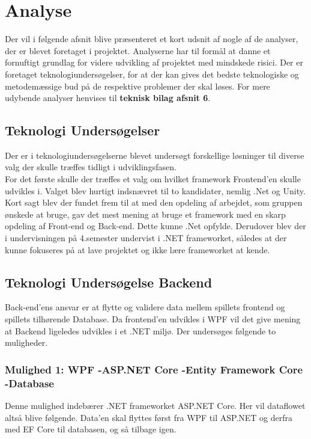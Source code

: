 \section{Analyse}
Der vil i følgende afsnit blive præsenteret et kort udsnit af nogle af de analyser, der er blevet foretaget i projektet. Analyserne har til formål at danne et fornuftigt grundlag for videre udvikling af
projektet med mindskede risici. Der er foretaget teknologiundersøgelser, for at der kan gives det bedste teknologiske og metodemæssige bud på de respektive problemer der skal løses. For mere udybende analyser henvises til \textbf{teknisk bilag afsnit 6}.

\subsection{Teknologi Undersøgelser}
Der er i teknologiundersøgelserne blevet undersøgt forskellige løsninger til diverse valg der skulle træffes tidligt i udviklingsfasen.\\
For det første skulle der træffes et valg om hvilket framework Frontend'en skulle udvikles i. Valget blev hurtigt indsnævret til to kandidater, nemlig .Net og Unity. Kort sagt blev der fundet frem til at med den opdeling af arbejdet, som gruppen ønskede at bruge, gav det mest mening at bruge et framework med en skarp opdeling af Front-end og Back-end. Dette kunne .Net opfylde. Derudover blev der i undervisningen på 4.semester undervist i .NET frameworket, således at der kunne fokuseres på at lave projektet og ikke lære frameworket at kende. 


\subsection{Teknologi Undersøgelse Backend}
Back-end’ens ansvar er at flytte og validere data mellem spillets frontend og spillets tilhørende Database. Da frontend'en udvikles i WPF vil det give mening at Backend ligeledes udvikles i et .NET miljø. Der undersøges følgende to muligheder.\\

\subsubsection{Mulighed 1: WPF -\g ASP.NET Core -\g Entity Framework Core -\g Database}
Denne mulighed indebærer .NET frameworket ASP.NET Core. Her vil dataflowet altså blive følgende. Data’en skal flyttes først fra WPF til ASP.NET og derfra med EF Core\cite{Entity-Framework-Core} til databasen, og så tilbage igen.

